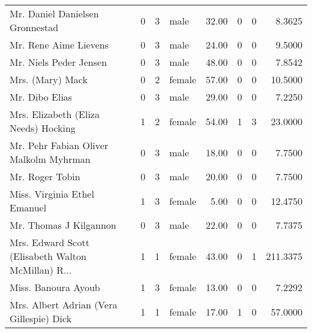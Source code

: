 \begin{tabular}{lrrlrrrr}
Mr. Daniel Danielsen Gronnestad                    &         0 &       3 &    male &  32.00 &                        0 &                        0 &    8.3625 \\
Mr. Rene Aime Lievens                              &         0 &       3 &    male &  24.00 &                        0 &                        0 &    9.5000 \\
Mr. Niels Peder Jensen                             &         0 &       3 &    male &  48.00 &                        0 &                        0 &    7.8542 \\
Mrs. (Mary) Mack                                   &         0 &       2 &  female &  57.00 &                        0 &                        0 &   10.5000 \\
Mr. Dibo Elias                                     &         0 &       3 &    male &  29.00 &                        0 &                        0 &    7.2250 \\
Mrs. Elizabeth (Eliza Needs) Hocking               &         1 &       2 &  female &  54.00 &                        1 &                        3 &   23.0000 \\
Mr. Pehr Fabian Oliver Malkolm Myhrman             &         0 &       3 &    male &  18.00 &                        0 &                        0 &    7.7500 \\
Mr. Roger Tobin                                    &         0 &       3 &    male &  20.00 &                        0 &                        0 &    7.7500 \\
Miss. Virginia Ethel Emanuel                       &         1 &       3 &  female &   5.00 &                        0 &                        0 &   12.4750 \\
Mr. Thomas J Kilgannon                             &         0 &       3 &    male &  22.00 &                        0 &                        0 &    7.7375 \\
Mrs. Edward Scott (Elisabeth Walton McMillan) R... &         1 &       1 &  female &  43.00 &                        0 &                        1 &  211.3375 \\
Miss. Banoura Ayoub                                &         1 &       3 &  female &  13.00 &                        0 &                        0 &    7.2292 \\
Mrs. Albert Adrian (Vera Gillespie) Dick           &         1 &       1 &  female &  17.00 &                        1 &                        0 &   57.0000 \\

\end{tabular}
